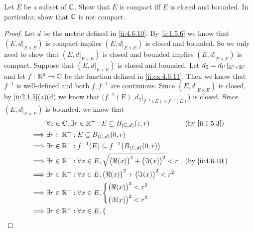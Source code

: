 \begin{ex}\label{ii:ex:4.6.13}
  Let \(E\) be a subset of \(\mathbb{C}\).
  Show that \(E\) is compact iff \(E\) is closed and bounded.
  In particular, show that \(\mathbb{C}\) is not compact.
\end{ex}

\begin{proof}
  Let \(d\) be the metric defined in \cref{ii:4.6.10}.
  By \cref{ii:1.5.6} we know that \((E, d|_{E \times E})\) is compact implies \((E, d|_{E \times E})\) is closed and bounded.
  So we only need to show that \((E, d|_{E \times E})\) is closed and bounded implies \((E, d|_{E \times E})\) is compact.
  Suppose that \((E, d|_{E \times E})\) is closed and bounded.
  Let \(d_2 = d_{l^1}|_{\mathbb{R}^2 \times \mathbb{R}^2}\) and let \(f : \mathbb{R}^2 \to \mathbb{C}\) be the function defined in \cref{ii:ex:4.6.11}.
  Then we know that \(f^{-1}\) is well-defined and both \(f, f^{-1}\) are continuous.
  Since \((E, d|_{E \times E})\) is closed, by \cref{ii:2.1.5}(a)(d) we know that \(\big(f^{-1}(E), d_2|_{f^{-1}(E) \times f^{-1}(E)}\big)\) is closed.
  Since \((E, d|_{E \times E})\) is bounded, we know that
  \begin{align*}
             & \forall z \in \C, \exists r \in \R^+ : E \subseteq B_{(\C, d)}(z, r)                     &  & \by{ii:1.5.3}  \\
    \implies & \exists r \in \R^+ : E \subseteq B_{(\C, d)}(0, r)                                                           \\
    \implies & \exists r \in \R^+ : f^{-1}(E) \subseteq f^{-1}\big(B_{(\C, d)}(0, r)\big)                                   \\
    \implies & \exists r \in \R^+ : \forall x \in E, \sqrt{\big(\Re(x)\big)^2 + \big(\Im(x)\big)^2} < r &  & \by{ii:4.6.10} \\
    \implies & \exists r \in \R^+ : \forall x \in E, \big(\Re(x)\big)^2 + \big(\Im(x)\big)^2 < r^2                          \\
    \implies & \exists r \in \R^+ : \forall x \in E, \begin{dcases}
                                                       \big(\Re(x)\big)^2 < r^2 \\
                                                       \big(\Im(x)\big)^2 < r^2
                                                     \end{dcases}                                               \\
    \implies & \exists r \in \R^+ : \forall x \in E, \begin{dcases}

\end{dcases}
\end{align*}
\end{proof}
